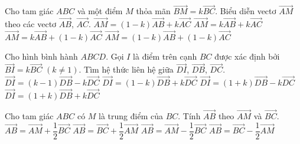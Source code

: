 \begin{ex}%
	Cho tam giác $ABC$ và một điểm $M$ thỏa mãn $\overrightarrow{BM}=k\overrightarrow{BC}$. Biểu diễn vectơ $\overrightarrow{AM}$ theo các vectơ $\overrightarrow{AB}$, $\overrightarrow{AC}$.
	\choice
	{\True $\overrightarrow{AM}=(1-k)\overrightarrow{AB}+k\overrightarrow{AC}$}
	{$\overrightarrow{AM}=k\overrightarrow{AB}+k\overrightarrow{AC}$}
	{$\overrightarrow{AM}=k\overrightarrow{AB}+(1-k)\overrightarrow{AC}$}
	{$\overrightarrow{AM}=(1-k)\overrightarrow{AB}+(1-k)\overrightarrow{AC}$}
\end{ex}

\begin{ex}%
	Cho hình bình hành $ABCD$. Gọi $I$ là điểm trên cạnh $BC$ được xác định bởi $\overrightarrow{BI}=k\overrightarrow{BC}$ $(k\neq 1)$. Tìm hệ thức liên hệ giữa $\overrightarrow{DI}$, $\overrightarrow{DB}$, $\overrightarrow{DC}$.
	\choice
	{$\overrightarrow{DI} =(k-1)\overrightarrow{DB}-k\overrightarrow{DC}$}
	{\True $\overrightarrow{DI}=(1-k)\overrightarrow{DB}+ k\overrightarrow{DC}$}
	{$\overrightarrow{DI}=(1+k)\overrightarrow{DB}-k\overrightarrow{DC}$}
	{$\overrightarrow{DI}=(1+k)\overrightarrow{DB}+k\overrightarrow{DC}$}
\end{ex}

\begin{ex}%
	Cho tam giác $ABC$ có $M$ là trung điểm của $BC$. Tính $\overrightarrow{AB}$ theo $\overrightarrow{AM}$ và $\overrightarrow{BC}$.
	\choice
	{$\overrightarrow{AB}=\overrightarrow{AM}+\dfrac{1}{2}\overrightarrow{BC}$}
	{$\overrightarrow{AB}=\overrightarrow{BC}+\dfrac{1}{2}\overrightarrow{AM}$}
	{\True $\overrightarrow{AB}=\overrightarrow{AM}-\dfrac{1}{2}\overrightarrow{BC}$}
	{$\overrightarrow{AB}=\overrightarrow{BC}-\dfrac{1}{2}\overrightarrow{AM}$}
\end{ex}

